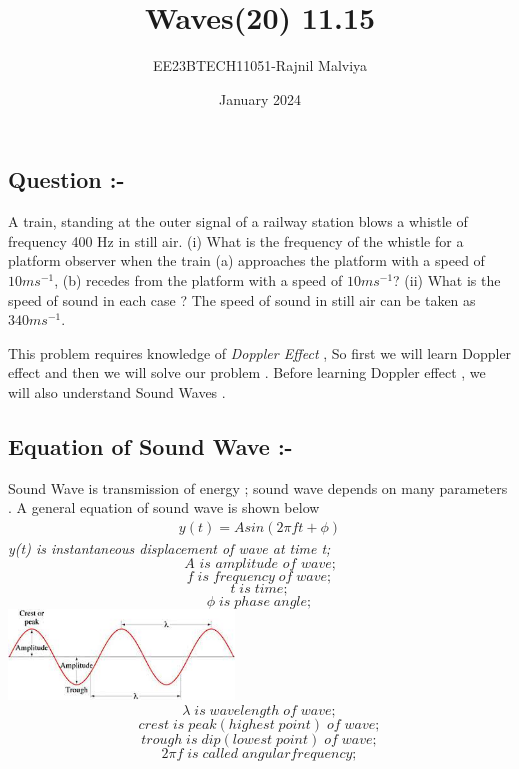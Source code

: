 \documentclass[journal,12pt,twocolumn]{IEEEtran}
\theoremstyle{remark}
\begin{document}
\title{Waves(20) 11.15}
\author{EE23BTECH11051-Rajnil Malviya}
\date{January 2024}



\maketitle

\subsection*{\textbf{Question :-}}
A train, standing at the outer signal of a railway station blows a whistle of frequency
400 Hz in still air. (i) What is the frequency of the whistle for a platform observer
when the train (a) approaches the platform with a speed of $10 ms^{-1} $, (b) recedes
from the platform with a speed of $10 ms^{-1} $? (ii) What is the speed of sound in each
case ? The speed of sound in still air can be taken as $340 ms^{-1} $.

\bigskip
 This problem requires knowledge of \textit{Doppler Effect} , So first we will learn Doppler effect and then we will solve our problem . Before learning Doppler effect , we will also understand Sound Waves .

\subsection*{\textbf{Equation of Sound Wave :-}}
Sound Wave is transmission of energy ; sound wave depends on many parameters . A general equation of sound wave is shown below 
\begin{align}y(t) = Asin( 2 \pi ft + \phi ) \end{align} 
\textit{y(t) is instantaneous 
displacement of wave at time t;}$$\textit{A is amplitude of wave;}$$$$f\;is\; frequency\; of\; wave;$$
$$t \;is\; time;$$$$\phi \; is \; phase \; angle;$$
\includegraphics[width=0.45\textwidth]{figs/waves.jpeg}\\
$$\lambda \;is\; wavelength\; of\; wave;$$$$crest \;is\; peak(highest\; point) \;of\; wave;$$$$trough\; is\; dip(lowest\; point) \;of\; wave;$$
$$2\pi f \;is \; called\; angular frequency;$$
\end{document}
